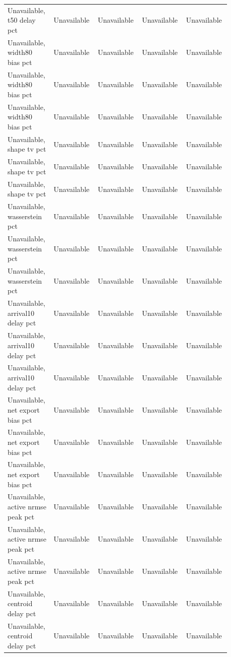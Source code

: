 \begin{longtable}{p{0.1760\linewidth}p{0.1760\linewidth}p{0.1760\linewidth}p{0.1760\linewidth}p{0.1760\linewidth}}
Unavailable, t50 delay pct & Unavailable & Unavailable & Unavailable & Unavailable \\
Unavailable, width80 bias pct & Unavailable & Unavailable & Unavailable & Unavailable \\
Unavailable, width80 bias pct & Unavailable & Unavailable & Unavailable & Unavailable \\
Unavailable, width80 bias pct & Unavailable & Unavailable & Unavailable & Unavailable \\
Unavailable, shape tv pct & Unavailable & Unavailable & Unavailable & Unavailable \\
Unavailable, shape tv pct & Unavailable & Unavailable & Unavailable & Unavailable \\
Unavailable, shape tv pct & Unavailable & Unavailable & Unavailable & Unavailable \\
Unavailable, wasserstein pct & Unavailable & Unavailable & Unavailable & Unavailable \\
Unavailable, wasserstein pct & Unavailable & Unavailable & Unavailable & Unavailable \\
Unavailable, wasserstein pct & Unavailable & Unavailable & Unavailable & Unavailable \\
Unavailable, arrival10 delay pct & Unavailable & Unavailable & Unavailable & Unavailable \\
Unavailable, arrival10 delay pct & Unavailable & Unavailable & Unavailable & Unavailable \\
Unavailable, arrival10 delay pct & Unavailable & Unavailable & Unavailable & Unavailable \\
Unavailable, net export bias pct & Unavailable & Unavailable & Unavailable & Unavailable \\
Unavailable, net export bias pct & Unavailable & Unavailable & Unavailable & Unavailable \\
Unavailable, net export bias pct & Unavailable & Unavailable & Unavailable & Unavailable \\
Unavailable, active nrmse peak pct & Unavailable & Unavailable & Unavailable & Unavailable \\
Unavailable, active nrmse peak pct & Unavailable & Unavailable & Unavailable & Unavailable \\
Unavailable, active nrmse peak pct & Unavailable & Unavailable & Unavailable & Unavailable \\
Unavailable, centroid delay pct & Unavailable & Unavailable & Unavailable & Unavailable \\
Unavailable, centroid delay pct & Unavailable & Unavailable & Unavailable & Unavailable \\

\end{longtable}
